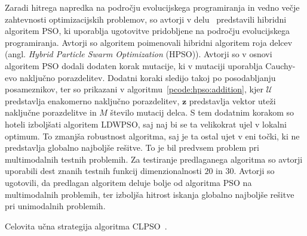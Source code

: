 Zaradi hitrega napredka na področju evolucijskega programiranja in vedno večje zahtevnosti optimizacijskih problemov, so avtorji v delu~\cite{alg:mpso} predstavili hibridni algoritem PSO, ki uporablja ugotovitve pridobljene na področju evolucijskega programiranja.
Avtorji so algoritem poimenovali hibridni algoritem roja delcev (angl. \textit{Hybrid Particle Swarm Optimization} (HPSO)).
Avtorji so v osnovi algoritem PSO dodali dodaten korak mutacije, ki v mutaciji uporablja Cauchy-evo naključno porazdelitev.
Dodatni koraki sledijo takoj po posodabljanju posameznikov, ter so prikazani v algoritmu~\ref{pcode:hpso:addition}, kjer $\mathcal{U}$ predstavlja enakomerno naključno porazdelitev, $\mathbf{z}$ predstavlja vektor uteži naključne porazdelitve in $\mathit{M}$ število mutacij delca.
S tem dodatnim korakom so hoteli izboljšati algoritem LDWPSO, saj naj bi se ta velikokrat ujel v lokalni optimum.
To zmanjša robustnost algoritma, saj je ta ostal ujet v eni točki, ki ne predstavlja globalno najboljše rešitve.
To je bil predvsem problem pri multimodalnih testnih problemih.
Za testiranje predlaganega algoritma so avtorji uporabili dest znanih testnih funkcij dimenzionalnosti $20$ in $30$.
Avtorji so ugotovili, da predlagan algoritem deluje bolje od algoritma PSO na multimodalnih problemih, ter izboljša hitrost iskanja globalno najboljše rešitve pri unimodalnih problemih.

\begin{algorithm}
    \DontPrintSemicolon


    \caption{Celovita učna strategija algoritma CLPSO~\cite{alg:clpso}.}\label{pcode:clpso:learning}
\end{algorithm}

